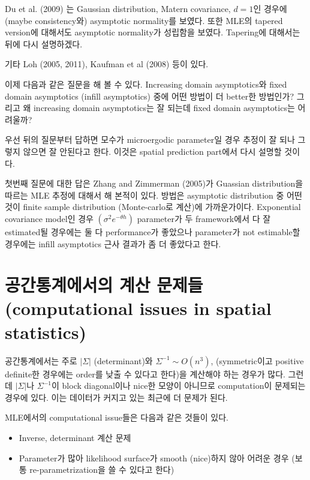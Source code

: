 \documentclass[b5paper,]{scrbook}
\theoremstyle{plain}
\theoremstyle{definition}
\numberwithin{equation}{section}
\begin{document}
Du et al. (2009) 는 Gaussian distribution, Matern covariance, \(d=1\)인
경우에 (maybe consistency와) asymptotic normality를 보였다. 또한 MLE의
tapered version에 대해서도 asymptotic normality가 성립함을 보였다.
Tapering에 대해서는 뒤에 다시 설명하겠다.

기타 Loh (2005, 2011), Kaufman et al (2008) 등이 있다.

이제 다음과 같은 질문을 해 볼 수 있다. Increasing domain asymptotics와
fixed domain asymptotics (infill asymptotics) 중에 어떤 방법이 더
better한 방법인가? 그리고 왜 increasing domain asymptotics는 잘 되는데
fixed domain asymptotics는 어려울까?

우선 뒤의 질문부터 답하면 모수가 microergodic parameter일 경우 추정이 잘
되나 그렇지 않으면 잘 안된다고 한다. 이것은 spatial prediction part에서
다시 설명할 것이다.

첫번째 질문에 대한 답은 Zhang and Zimmerman (2005)가 Guassian
distribution을 따르는 MLE 추정에 대해서 해 본적이 있다. 방법은
asymptotic distribution 중 어떤 것이 finite sample distribution
(Monte-carlo로 계산)에 가까운가이다. Exponential covariance model인 경우
\((\sigma^{2}e^{-\theta h})\) parameter가 두 framework에서 다 잘
estimated될 경우에는 둘 다 performance가 좋았으나 parameter가 not
estimable할 경우에는 infill asymptotics 근사 결과가 좀 더 좋았다고 한다.

\section{공간통계에서의 계산 문제들(computational issues in spatial
statistics)}\label{--computational-issues-in-spatial-statistics}

공간통계에서는 주로 \(|\Sigma|\) (determinant)와
\(\Sigma^{-1} \sim O(n^{3})\), (symmetric이고 positive definite한
경우에는 order를 낮출 수 있다고 한다)을 계산해야 하는 경우가 많다.
그런데 \(|\Sigma|\)나 \(\Sigma^{-1}\)이 block diagonal이나 nice한 모양이
아니므로 computation이 문제되는 경우에 있다. 이는 데이터가 커지고 있는
최근에 더 문제가 된다.

MLE에서의 computational issue들은 다음과 같은 것들이 있다.

\begin{itemize}
\item
  Inverse, determinant 계산 문제
\item
  Parameter가 많아 likelihood surface가 smooth (nice)하지 않아 어려운
  경우 (보통 re-parametrization을 쓸 수 있다고 한다)
\end{itemize}
\end{document}
